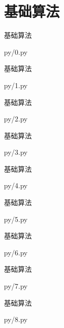 \documentclass{beamer}
\begin{document}
\section{基础算法}
	\begin{frame}{基础算法}
			
							{py/0.py}
	\end{frame}
	\begin{frame}{基础算法}
			
							{py/1.py}
	\end{frame}
	\begin{frame}{基础算法}
			
							{py/2.py}
	\end{frame}
	\begin{frame}{基础算法}
			
							{py/3.py}
	\end{frame}
	\begin{frame}{基础算法}
			
							{py/4.py}
	\end{frame}
	\begin{frame}{基础算法}
			
							{py/5.py}
	\end{frame}
	\begin{frame}{基础算法}
			
							{py/6.py}
	\end{frame}
	\begin{frame}{基础算法}
			
							{py/7.py}
	\end{frame}
	\begin{frame}{基础算法}
			
							{py/8.py}
	\end{frame}
\end{document}
